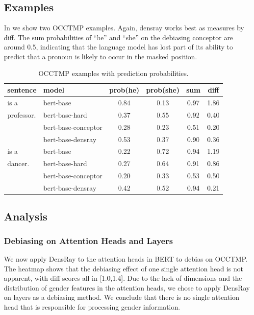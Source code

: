 \subsection{Examples}
In  we show two OCCTMP examples.
Again, densray works best as measures by diff.
The sum probabilities of ``he'' and ``she''
on the debiasing conceptor are around 0.5, indicating that
the
language model has lost part of its ability to predict that 
a pronoun is  likely to occur in the masked position.
\begin{table}[h]
	\centering
	\footnotesize
	\begin{tabular}{llcccc}
		\hline
		sentence & model & prob(he) & prob(she) &sum&diff\\
		\hline
		[MASK] is a & bert-base & 0.84 & 0.13&0.97&1.86\\
		professor.& bert-base-hard& 0.37 & 0.55&0.92&0.40\\
		& bert-base-conceptor& 0.28 & 0.23&0.51&{0.20}\\
		& bert-base-densray & 0.53 & 0.37&0.90&0.36\\
		\hline
		[MASK] is a & bert-base & 0.22 & 0.72&0.94&1.19\\
		dancer.  & bert-base-hard& 0.27 & 0.64&0.91&0.86\\
		& bert-base-conceptor& 0.20 & 0.33&0.53&0.50\\
		& bert-base-densray& 0.42 & 0.52&0.94&0.21\\
		\hline
	\end{tabular}
	\caption{
		OCCTMP examples with prediction probabilities.}
\end{table}


\subsection{Analysis}

\subsubsection{Debiasing on Attention Heads and Layers}
We now apply DensRay to the attention heads in BERT to debias on OCCTMP. The heatmap  shows that the debiasing effect of one single attention head is not apparent, with diff scores all in [1.0,1.4]. Due to the lack of dimensions and the distribution of gender features in the attention heads, we chose to apply DensRay on layers as a debiasing method. We conclude that there is no single attention head that is responsible for processing gender information.

